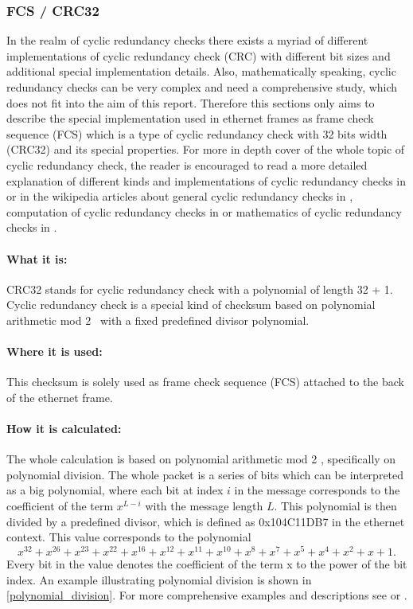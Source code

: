 \subsubsection{FCS / CRC32}\label{section:fcs}
In the realm of cyclic redundancy checks there exists a myriad of different implementations of cyclic redundancy check (CRC) with different bit sizes and additional special implementation details. Also, mathematically speaking, cyclic redundancy checks can be very complex and need a comprehensive study, which does not fit into the aim of this report. Therefore this sections only aims to describe the special implementation used in ethernet frames as frame check sequence (FCS) which is a type of cyclic redundancy check with 32 bits width (CRC32) and its special properties. For more in depth cover of the whole topic of cyclic redundancy check, the reader is encouraged to read a more detailed explanation of different kinds and implementations of cyclic redundancy checks in \cite{zlib.net:crc} or in the wikipedia articles about general cyclic redundancy checks in \cite{wikipedia.org:crc}, computation of cyclic redundancy checks in \cite{wikipedia.org:comp_crc} or mathematics of cyclic redundancy checks in \cite{wikipedia.org:math_crc}.

\paragraph{What it is:}
CRC32 stands for cyclic redundancy check with a polynomial of length 32 + 1. Cyclic redundancy check is a special kind of checksum based on polynomial arithmetic mod 2~\cite{wikipedia.org:crc} with a fixed predefined divisor polynomial.

\paragraph{Where it is used:}
This checksum is solely used as frame check sequence (FCS) attached to the back of the ethernet frame.

\paragraph{How it is calculated:}
The whole calculation is based on polynomial arithmetic mod 2 \cite{wikipedia.org:crc}, specifically on polynomial division. The whole packet is a series of bits which can be interpreted as a big polynomial, where each bit at index $i$ in the message corresponds to the coefficient of the term \(x^{L - i}\) with the message length $L$. This polynomial is then divided by a predefined divisor, which is defined as 0x104C11DB7 in the ethernet context. This value corresponds to the polynomial
\begin{equation}
  x^{32} + x^{26} + x^{23} + x^{22} + x^{16} + x^{12} + x^{11} + x^{10} + x^{8} + x^{7} + x^{5} + x^{4} + x^{2} + x + 1.
\end{equation}
Every bit in the value denotes the coefficient of the term x to the power of the bit index. An example illustrating polynomial division is shown in \ref{polynomial_division}. For more comprehensive examples and descriptions see \cite{wikipedia.org:crc} or \cite{zlib.net:crc}.

